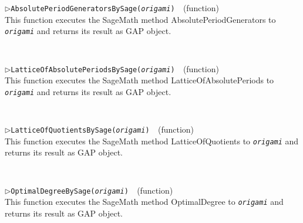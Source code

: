 \documentclass[a4paper,11pt]{report}
\begin{document}
{{{\begin{Verbatim}[commandchars=!@|,fontsize=\small,frame=single,label=Example]
\end{Verbatim}
 \noindent\textcolor{FuncColor}{$\triangleright$\enspace\texttt{AbsolutePeriodGeneratorsBySage({\mdseries\slshape origami})
\label{AbsolutePeriodGeneratorsBySage}
}\hfill{\scriptsize (function)}}\\


 This function executes the SageMath method AbsolutePeriodGenerators to \mbox{\texttt{\mdseries\slshape origami}} and returns its result as \textsf{GAP} object. 
\begin{Verbatim}[commandchars=!@|,fontsize=\small,frame=single,label=Example]
  
\end{Verbatim}
 \noindent\textcolor{FuncColor}{$\triangleright$\enspace\texttt{LatticeOfAbsolutePeriodsBySage({\mdseries\slshape origami})
\label{LatticeOfAbsolutePeriodsBySage}
}\hfill{\scriptsize (function)}}\\


 This function executes the SageMath method LatticeOfAbsolutePeriods to \mbox{\texttt{\mdseries\slshape origami}} and returns its result as \textsf{GAP} object. 
\begin{Verbatim}[commandchars=!@|,fontsize=\small,frame=single,label=Example]
  
\end{Verbatim}
 \noindent\textcolor{FuncColor}{$\triangleright$\enspace\texttt{LatticeOfQuotientsBySage({\mdseries\slshape origami})
\label{LatticeOfQuotientsBySage}
}\hfill{\scriptsize (function)}}\\


 This function executes the SageMath method LatticeOfQuotients to \mbox{\texttt{\mdseries\slshape origami}} and returns its result as \textsf{GAP} object. 
\begin{Verbatim}[commandchars=!@|,fontsize=\small,frame=single,label=Example]
  
\end{Verbatim}
 \noindent\textcolor{FuncColor}{$\triangleright$\enspace\texttt{OptimalDegreeBySage({\mdseries\slshape origami})
\label{OptimalDegreeBySage}
}\hfill{\scriptsize (function)}}\\


 This function executes the SageMath method OptimalDegree to \mbox{\texttt{\mdseries\slshape origami}} and returns its result as \textsf{GAP} object. 
\begin{Verbatim}[commandchars=!@|,fontsize=\small,frame=single,label=Example]
  

\end{Verbatim}}}}
\end{document}
